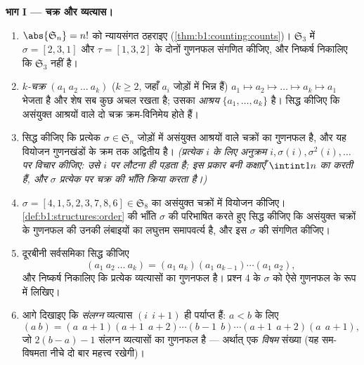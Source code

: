 \begin{problem}
\medskip \noindent\textbf{भाग I --- चक्र और व्यत्यास।}
\begin{enumerate}
  \item $\abs{\mathfrak S_n} = n!$ को न्यायसंगत ठहराइए
  (\cref{thm:b1:counting:counts})। $\mathfrak S_3$ में $\sigma = [2, 3, 1]$
  और $\tau = [1, 3, 2]$ के दोनों गुणनफल संगणित कीजिए, और निष्कर्ष निकालिए कि
  $\mathfrak S_3$  नहीं है।
  \item \emph{$k$-चक्र} $(a_1\ a_2\ \dots\ a_k)$ ($k \geq 2$, जहाँ $a_i$
  जोड़ों में भिन्न हैं) $a_1 \mapsto a_2 \mapsto \dots \mapsto a_k \mapsto
  a_1$ भेजता है और शेष सब कुछ अचल रखता है; उसका \emph{आश्रय} $\{a_1, \dots,
  a_k\}$ है। सिद्ध कीजिए कि असंयुक्त आश्रयों वाले दो चक्र क्रम-विनिमेय होते
  हैं।
  \item सिद्ध कीजिए कि प्रत्येक $\sigma \in \mathfrak S_n$ जोड़ों में
  असंयुक्त आश्रयों वाले चक्रों का गुणनफल है, और यह वियोजन गुणनखंडों के क्रम
  तक अद्वितीय है। \emph{(प्रत्येक $i$ के लिए अनुक्रम $i, \sigma(i),
  \sigma^2(i), \dots$ पर विचार कीजिए: उसे $i$ पर लौटना ही पड़ता है; इस
  प्रकार बनी \emph{कक्षाएँ} $\intint1n$ का  करती हैं, और $\sigma$
  प्रत्येक पर चक्र की भाँति क्रिया करता है।)}
  \item $\sigma = [4, 1, 5, 2, 3, 7, 8, 6] \in \mathfrak S_8$ का असंयुक्त
  चक्रों में वियोजन कीजिए। \cref{def:b1:structures:order} की भाँति $\sigma$
  की \emph{} परिभाषित करते हुए सिद्ध कीजिए कि असंयुक्त चक्रों के गुणनफल
  की  उनकी लंबाइयों का लघुत्तम समापवर्त्य है, और इस $\sigma$ की 
  संगणित कीजिए।
  \item दूरबीनी सर्वसमिका सिद्ध कीजिए
        \[
        (a_1\ a_2\ \dots\ a_k)
        = (a_1\ a_k)(a_1\ a_{k-1})\cdots(a_1\ a_2) ,
        \]
        और निष्कर्ष निकालिए कि प्रत्येक  व्यत्यासों का गुणनफल है।
        प्रश्न 4 के $\sigma$ को ऐसे गुणनफल के रूप में लिखिए।
  \item आगे दिखाइए कि \emph{संलग्न} व्यत्यास $(i\ \ i{+}1)$ ही पर्याप्त हैं:
  $a < b$ के लिए
        \[
        (a\ b) = (a\ \ a{+}1)(a{+}1\ \ a{+}2)\cdots(b{-}1\ \ b)
        \cdots(a{+}1\ \ a{+}2)(a\ \ a{+}1),
        \]
        जो $2(b - a) - 1$ संलग्न व्यत्यासों का गुणनफल है --- अर्थात् एक
        \emph{विषम} संख्या (यह सम-विषमता नीचे दो बार महत्त्व रखेगी)।
\end{enumerate}


\end{problem}
